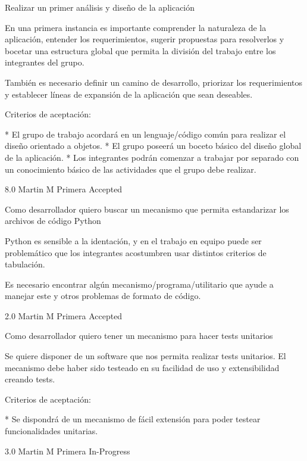 	{Realizar un primer análisis y diseño de la aplicación} %
	{En una primera instancia es importante comprender la naturaleza de la
aplicación, entender los requerimientos, sugerir propuestas para resolverlos y
bocetar una estructura global que permita la división del trabajo entre los
integrantes del grupo.

  

También es necesario definir un camino de desarrollo, priorizar los
requerimientos y establecer líneas de expansión de la aplicación que sean
deseables.

  
Criterios de aceptación:

* El grupo de trabajo acordará en un lenguaje/código común para realizar el diseño orientado a objetos.  
* El grupo poseerá un boceto básico del diseño global de la aplicación.  
* Los integrantes podrán comenzar a trabajar por separado con un conocimiento básico de las actividades que el grupo debe realizar.  

} %
	{} %
	{8.0} %
	{Martin M} %
	{Primera} %
	{Accepted} %


\vspace{20pt}

	{Como desarrollador quiero buscar un mecanismo que permita estandarizar los archivos de código Python} %
	{Python es sensible a la identación, y en el trabajo en equipo puede ser
problemático que los integrantes acostumbren usar distintos criterios de
tabulación.

  

Es necesario encontrar algún mecanismo/programa/utilitario que ayude a manejar
este y otros problemas de formato de código.

} %
	{} %
	{2.0} %
	{Martin M} %
	{Primera} %
	{Accepted} %


\vspace{20pt}

	{Como desarrollador quiero tener un mecanismo para hacer tests unitarios} %
	{Se quiere disponer de un software que nos permita realizar tests unitarios. El
mecanismo debe haber sido testeado en su facilidad de uso y extensibilidad
creando tests.

  
  
Criterios de aceptación:

  
* Se dispondrá de un mecanismo de fácil extensión para poder testear funcionalidades unitarias. 

} %
	{} %
	{3.0} %
	{Martin M} %
	{Primera} %
	{In-Progress} %

